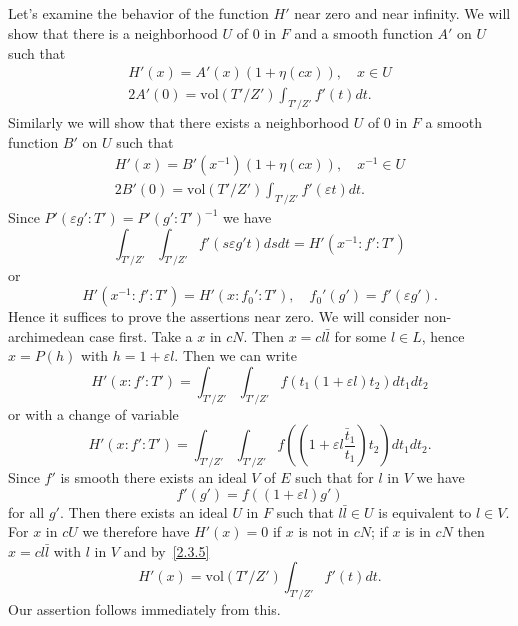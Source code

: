 \subsection{}
Let's examine the behavior of the function $H'$ near zero and near infinity.
We will show that there is a neighborhood $U$ of 0 in $F$ and a smooth function $A'$ on $U$ such that
\begin{align}
    H'(x) = A'(x) (1 + \eta(cx)), \quad x \in U \\
    2A'(0) = \mathrm{vol}(T'/Z') \int_{T'/Z'} f'(t) dt.
\end{align}
Similarly we will show that there exists a neighborhood $U$ of 0 in $F$ a smooth function $B'$ on $U$ such that
\begin{align}
    H'(x) = B'(x^{-1}) (1 + \eta(cx)), \quad x^{-1} \in U \\
    2B'(0) = \mathrm{vol}(T'/Z') \int_{T'/Z'} f'(\varepsilon t) dt.
\end{align}
Since $P'(\varepsilon g': T') = {P'(g':T')}^{-1}$ we have
\[
\int_{T'/Z'} \int_{T'/Z'} f'(s\varepsilon g't) dsdt = H'(x^{-1}:f':T')
\]
or
\[
H'(x^{-1}:f': T') = H'(x:f_0':T'), \quad f_0'(g') = f'(\varepsilon g').
\]
Hence it suffices to prove the assertions near zero.
We will consider non-archimedean case first.
Take a $x$ in $cN$.
Then $x = cl\bar{l}$ for some $l \in L$, hence $x = P(h)$ with $h = 1 + \varepsilon l$.
Then we can write
\[
H'(x:f':T')=\int_{T'/Z'} \int_{T'/Z'} f(t_1 (1 + \varepsilon l) t_2) dt_1 dt_2
\]
or with a change of variable
\begin{equation}
\label{2.3.5}
H'(x:f':T') = \int_{T'/Z'} \int_{T'/Z'} f\left(\left(1 + \varepsilon l \frac{\bar{t}_{1}}{t_ {1}} \right)t_{2} \right) dt_1 dt_2.
\end{equation}
Since $f'$ is smooth there exists an ideal $V$ of $E$ such that for $l$ in $V$ we have
\[
f'(g') = f((1 + \varepsilon l) g')
\]
for all $g'$.
Then there exists an ideal $U$ in $F$ such that $l \bar{l} \in U$ is equivalent to $l \in V$.
For $x$ in $cU$ we therefore have $H'(x) = 0$ if $x$ is not in $cN$; if $x$ is in $cN$ then $x = cl\bar{l}$ with $l$ in $V$ and by~\eqref{2.3.5}
\[
H'(x) = \mathrm{vol}(T'/Z') \int_{T'/Z'} f'(t) dt.
\]
Our assertion follows immediately from this.

